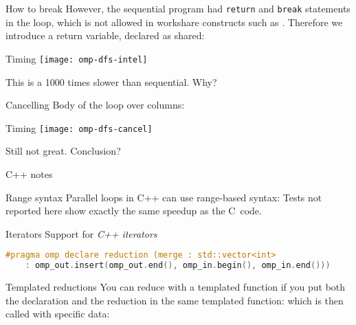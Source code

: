 \documentclass[11pt,headernav]{beamer}
\begin{document}
\begin{numberedframe}{How to break}
However, the sequential program had \lstinline{return} and \lstinline{break}
statements in the loop, which is not allowed in workshare constructs
such as .
Therefore we introduce a return variable, declared as shared:
%
\end{numberedframe}

\begin{numberedframe}{Timing}
  \texttt{[image: omp-dfs-intel]}

  This is a 1000 times slower than sequential. Why?
\end{numberedframe}

\begin{numberedframe}{Cancelling}
  Body of the loop over columns:
  
\end{numberedframe}

\begin{numberedframe}{Timing}
  \texttt{[image: omp-dfs-cancel]}

  Still not great. Conclusion?
\end{numberedframe}

\begin{frame}
  {C++ notes}
\end{frame}

\begin{numberedframe}{Range syntax}
  Parallel loops in C++ can use range-based syntax:
  Tests not reported here show exactly the same speedup as the C~code.
\end{numberedframe}

\begin{numberedframe}{Iterators}
  Support for
  \emph{C++ iterators}
\begin{lstlisting}[language=C++]
#pragma omp declare reduction (merge : std::vector<int>
    : omp_out.insert(omp_out.end(), omp_in.begin(), omp_in.end())) 
\end{lstlisting}
\end{numberedframe}

\begin{numberedframe}{Templated reductions}
  You can reduce with a templated function
  if you put both the declaration and the reduction
  in the same templated function:
  which is then called with specific data:
\end{numberedframe}
\end{document}
